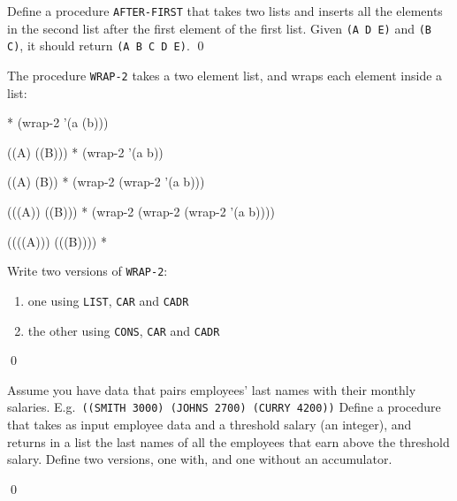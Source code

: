 \documentclass[a4paper,11pt]{article}
\begin{document}
\begin{uexercise}
Define a procedure \Verb+AFTER-FIRST+ that takes two lists and inserts all the elements in the second list after the first element of the first list. Given \Verb+(A D E)+ and \Verb+(B C)+, it should return \Verb+(A B C D E)+.
\qed
\end{uexercise}

\begin{uexercise}
The procedure \Verb+WRAP-2+ takes a two element list, and wraps each element inside a list: 

\begin{lispcode}
* (wrap-2 '(a (b)))

((A) ((B)))
* (wrap-2 '(a b))

((A) (B))
* (wrap-2 (wrap-2 '(a b)))

(((A)) ((B)))
* (wrap-2 (wrap-2 (wrap-2 '(a b))))

((((A))) (((B))))
* 
\end{lispcode}

Write two versions of \Verb+WRAP-2+:

\begin{enumerate}
\item one using \Verb+LIST+, \Verb+CAR+ and \Verb+CADR+
\item the other using \Verb+CONS+, \Verb+CAR+ and \Verb+CADR+
\end{enumerate}

\qed
\end{uexercise}


% 
% 
% 
% 

\begin{uexercise}
Assume you have data that pairs employees' last names with their
monthly salaries. E.g.\ \Verb+((SMITH 3000) (JOHNS 2700) (CURRY 4200))+ Define a procedure that takes as input employee data and a threshold salary (an integer), and returns in a list the last names of all the employees that earn above the threshold salary. Define two versions, one with, and one without an accumulator.

\qed
\end{uexercise}
\end{document}
